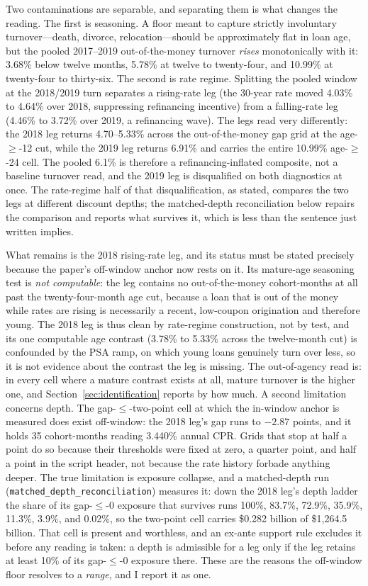 \documentclass[12pt]{article}
\begin{document}
Two contaminations are separable, and separating them is what changes the reading. The first is seasoning. A floor meant to capture strictly involuntary turnover---death, divorce, relocation---should be approximately flat in loan age, but the pooled 2017--2019 out-of-the-money turnover \emph{rises} monotonically with it: 3.68\% below twelve months, 5.78\% at twelve to twenty-four, and 10.99\% at twenty-four to thirty-six. The second is rate regime. Splitting the pooled window at the 2018/2019 turn separates a rising-rate leg (the 30-year rate moved 4.03\% to 4.64\% over 2018, suppressing refinancing incentive) from a falling-rate leg (4.46\% to 3.72\% over 2019, a refinancing wave). The legs read very differently: the 2018 leg returns 4.70--5.33\% across the out-of-the-money gap grid at the age-$\geq$-12 cut, while the 2019 leg returns 6.91\% and carries the entire 10.99\% age-$\geq$-24 cell. The pooled 6.1\% is therefore a refinancing-inflated composite, not a baseline turnover read, and the 2019 leg is disqualified on both diagnostics at once. The rate-regime half of that disqualification, as stated, compares the two legs at different discount depths; the matched-depth reconciliation below repairs the comparison and reports what survives it, which is less than the sentence just written implies.

What remains is the 2018 rising-rate leg, and its status must be stated precisely because the paper's off-window anchor now rests on it. Its mature-age seasoning test is \emph{not computable}: the leg contains no out-of-the-money cohort-months at all past the twenty-four-month age cut, because a loan that is out of the money while rates are rising is necessarily a recent, low-coupon origination and therefore young. The 2018 leg is thus clean by rate-regime construction, not by test, and its one computable age contrast (3.78\% to 5.33\% across the twelve-month cut) is confounded by the PSA ramp, on which young loans genuinely turn over less, so it is not evidence about the contrast the leg is missing. The out-of-agency read is: in every cell where a mature contrast exists at all, mature turnover is the higher one, and Section~\ref{sec:identification} reports by how much. A second limitation concerns depth. The gap-$\leq$-two-point cell at which the in-window anchor is measured does exist off-window: the 2018 leg's gap runs to $-2.87$ points, and it holds 35 cohort-months reading 3.440\% annual CPR. Grids that stop at half a point do so because their thresholds were fixed at zero, a quarter point, and half a point in the script header, not because the rate history forbade anything deeper. The true limitation is exposure collapse, and a matched-depth run (\texttt{matched\_depth\_reconciliation}) measures it: down the 2018 leg's depth ladder the share of its gap-$\leq$-0 exposure that survives runs 100\%, 83.7\%, 72.9\%, 35.9\%, 11.3\%, 3.9\%, and 0.02\%, so the two-point cell carries \$0.282 billion of \$1{,}264.5 billion. That cell is present and worthless, and an ex-ante support rule excludes it before any reading is taken: a depth is admissible for a leg only if the leg retains at least 10\% of its gap-$\leq$-0 exposure there. These are the reasons the off-window floor resolves to a \emph{range}, and I report it as one.
\end{document}
